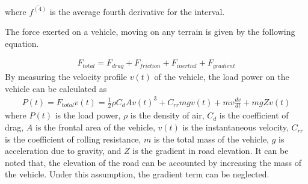 \documentclass[book.tex]{subfiles}
\begin{document}
where $\bar{f^{(4)}}$ is the average fourth derivative for the interval.

\begin{example}
The force exerted on a vehicle, moving on any terrain is given by the following equation.

\begin{align}
F_{total} = F_{drag}+F_{friction}+F_{inertial}+F_{gradient}
\end{align}
By measuring the velocity profile $v(t)$ of the vehicle, the load power on the vehicle can be calculated as
\begin{align}
P(t) = F_{total} v(t) = \frac{1}{2}\rho C_dA v(t)^3 + C_{rr}mg v(t) + mv\frac{dv}{dt} + mgZ  v(t)
\end{align}
where $P(t)$ is the load power, $\rho$ is the density of air, $C_d$ is the coefficient of drag, $A$ is the frontal area of the vehicle, $v(t)$ is the instantaneous velocity, $C_{rr}$ is the coefficient of rolling resistance, $m$ is the total mass of the vehicle, $g$ is acceleration due to gravity, and $Z$ is the gradient in road elevation. It can be noted that, the elevation of the road can be accounted by increasing the mass of the vehicle. Under this assumption, the gradient term can be neglected.





\end{example}
\end{document}
